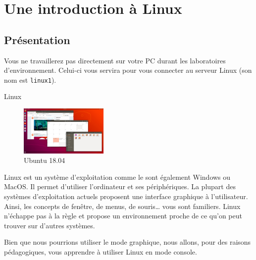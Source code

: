 \documentclass[a4paper,11pt]{style-esi/td}
\begin{document}
\newpage
\section{Une introduction à Linux}


	\subsection{Présentation}

		Vous ne travaillerez pas directement sur votre PC durant les laboratoires d'environnement. 
		Celui-ci vous servira pour vous connecter au serveur Linux
		(son nom est \verb_linux1_).

		\begin{theorie}{Linux}
			\begin{figure} 
				\vspace{-1em}
				\flushright
				\includegraphics[width=0.38\textwidth]{images/ubuntu}
				\caption{Ubuntu 18.04}
				\vspace{-1em}
			\end{figure} 
			Linux est un système d'exploitation comme le sont également Windows ou MacOS. 
			Il permet d'utiliser l'ordinateur et ses périphériques. 
			La plupart des systèmes d'exploitation actuels proposent 
			une interface graphique à l'utilisateur. 
			Ainsi, les concepts de fenêtre, de menus, de souris\dots{} vous sont familiers. 
			Linux n'échappe pas à la règle et propose un environnement 
			proche de ce qu'on peut trouver sur d'autres systèmes.
		\end{theorie}

		Bien que nous pourrions utiliser le mode graphique, 
		nous allons, pour des raisons pédagogiques, 
		vous apprendre à utiliser Linux en mode console.
\end{document}
